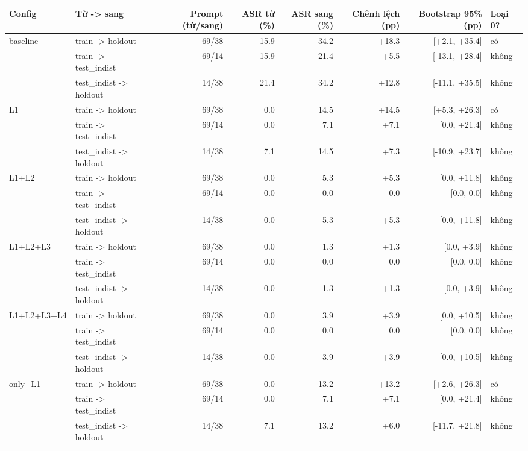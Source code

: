 \begin{tabular}{llrrrrrl}
\toprule
Config & Từ -> sang & Prompt (từ/sang) & ASR từ (\%) & ASR sang (\%) & Chênh lệch (pp) & Bootstrap 95\% (pp) & Loại 0? \\
\midrule
baseline & train -> holdout & 69/38 & 15.9 & 34.2 & +18.3 & [+2.1, +35.4] & có \\
 & train -> test\_indist & 69/14 & 15.9 & 21.4 & +5.5 & [-13.1, +28.4] & không \\
 & test\_indist -> holdout & 14/38 & 21.4 & 34.2 & +12.8 & [-11.1, +35.5] & không \\
\midrule
L1 & train -> holdout & 69/38 & 0.0 & 14.5 & +14.5 & [+5.3, +26.3] & có \\
 & train -> test\_indist & 69/14 & 0.0 & 7.1 & +7.1 & [0.0, +21.4] & không \\
 & test\_indist -> holdout & 14/38 & 7.1 & 14.5 & +7.3 & [-10.9, +23.7] & không \\
\midrule
L1+L2 & train -> holdout & 69/38 & 0.0 & 5.3 & +5.3 & [0.0, +11.8] & không \\
 & train -> test\_indist & 69/14 & 0.0 & 0.0 & 0.0 & [0.0, 0.0] & không \\
 & test\_indist -> holdout & 14/38 & 0.0 & 5.3 & +5.3 & [0.0, +11.8] & không \\
\midrule
L1+L2+L3 & train -> holdout & 69/38 & 0.0 & 1.3 & +1.3 & [0.0, +3.9] & không \\
 & train -> test\_indist & 69/14 & 0.0 & 0.0 & 0.0 & [0.0, 0.0] & không \\
 & test\_indist -> holdout & 14/38 & 0.0 & 1.3 & +1.3 & [0.0, +3.9] & không \\
\midrule
L1+L2+L3+L4 & train -> holdout & 69/38 & 0.0 & 3.9 & +3.9 & [0.0, +10.5] & không \\
 & train -> test\_indist & 69/14 & 0.0 & 0.0 & 0.0 & [0.0, 0.0] & không \\
 & test\_indist -> holdout & 14/38 & 0.0 & 3.9 & +3.9 & [0.0, +10.5] & không \\
\midrule
only\_L1 & train -> holdout & 69/38 & 0.0 & 13.2 & +13.2 & [+2.6, +26.3] & có \\
 & train -> test\_indist & 69/14 & 0.0 & 7.1 & +7.1 & [0.0, +21.4] & không \\
 & test\_indist -> holdout & 14/38 & 7.1 & 13.2 & +6.0 & [-11.7, +21.8] & không \\
\bottomrule
\end{tabular}
